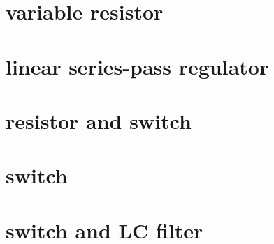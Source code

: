 \section{variable resistor}
\section{linear series-pass regulator}










\section{resistor and switch}
\section{switch}
\section{switch and LC filter}









